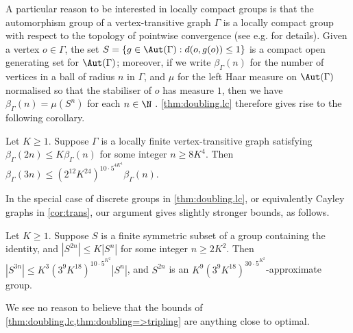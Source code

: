 A particular reason to be interested in locally compact groups is that the automorphism group of a vertex-transitive graph $\Gamma$ is a locally compact group with respect to the topology of pointwise convergence (see e.g. \cite[\S4]{ttTrof} for details). Given a vertex $o\in\Gamma$, the set $S=\{g\in\Aut(\Gamma):d(o,g(o))\le1\}$ is a compact open generating set for $\Aut(\Gamma)$; moreover, if we write $\beta_\Gamma(n)$ for the number of vertices in a ball of radius $n$ in $\Gamma$, and $\mu$ for the left Haar measure on $\Aut(\Gamma)$ normalised so that the stabiliser of $o$ has measure $1$, then we have $\beta_\Gamma(n)=\mu(S^n)$ for each $n\in\N$ \cite[Lemma 4.8]{ttTrof}. \cref{thm:doubling.lc} therefore gives rise to the following corollary.
\begin{corollary}\label{cor:trans}
Let $K\ge1$. Suppose $\Gamma$ is a locally finite vertex-transitive graph satisfying $\beta_\Gamma(2n)\le K\beta_\Gamma(n)$ for some integer $n\ge8K^4$. Then $\beta_\Gamma(3n)\le(2^{12}K^{24})^{10\cdot5^{4K^4}}\beta_\Gamma(n)$.
\end{corollary}
In the special case of discrete groups in \cref{thm:doubling.lc}, or equivalently Cayley graphs in \cref{cor:trans}, our argument gives slightly stronger bounds, as follows.
\begin{theorem}\label{thm:doubling=>tripling}
Let $K\ge1$. Suppose $S$ is a finite symmetric subset of a group containing the identity, and $|S^{2n}|\le K|S^n|$ for some integer $n\ge2K^2$. Then $|S^{3n}|\le K^3(3^9K^{18})^{10\cdot5^{K^2}}|S^n|$, and $S^{2n}$ is an $K^9(3^9K^{18})^{30\cdot5^{K^2}}$-approximate group.
\end{theorem}
We see no reason to believe that the bounds of \cref{thm:doubling.lc,thm:doubling=>tripling} are anything close to optimal.
